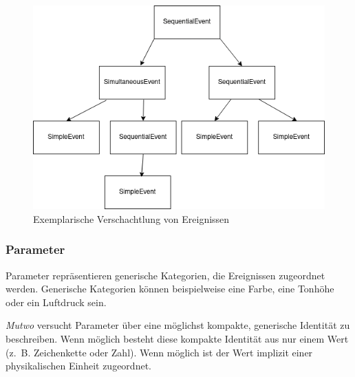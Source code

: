 \documentclass[12pt,a4paper,ngerman]{article}
\begin{document}
\begin{figure}[h!]
    \begin{center}
        \includegraphics[scale=0.5]{pictures/nested_event.png}

        \caption{Exemplarische Verschachtlung von Ereignissen}
    \end{center}
\end{figure}


\subsubsection{Parameter}
\label{parameterSpecification}

Parameter repräsentieren generische Kategorien, die Ereignissen zugeordnet werden.
Generische Kategorien können beispielweise eine Farbe, eine Tonhöhe oder ein Luftdruck sein.

\bigskip

\emph{Mutwo} versucht Parameter über eine möglichst kompakte, generische Identität zu beschreiben.
Wenn möglich besteht diese kompakte Identität aus nur einem Wert (z.~B. Zeichenkette oder Zahl).
Wenn möglich ist der Wert implizit einer physikalischen Einheit zugeordnet.
\end{document}
